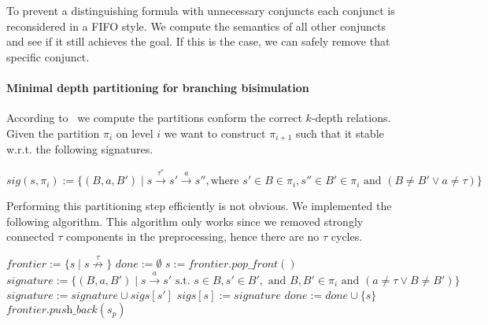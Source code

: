 \documentclass{article}
\newcommand{\pijl}[1]{\stackrel{#1}{\longrightarrow}}
\newcommand{\notpijl}[1]{\stackrel{#1}{\not\longrightarrow}}
\begin{document}
To prevent a distinguishing formula with unnecessary conjuncts each conjunct is
reconsidered in a FIFO style. We compute the semantics of all other conjuncts
and see if it still achieves the goal. If this is the case, we can safely remove
that specific conjunct.

\paragraph*{Minimal depth partitioning for branching bisimulation}
According to~\cite{M24} we compute the partitions conform the correct $k$-depth
relations. Given the partition $\pi_i$ on level $i$ we want to construct
$\pi_{i{+}1}$ such that it stable w.r.t. the following signatures.

\[
  \mathit{sig}(s, \pi_i) := \{(B, a, B') \mid s \pijl{\tau^*} s' \pijl{a} s''
  , \textrm{where } s'\in B\in \pi_i, s''\in B'\in \pi_i\textrm{ and } (B \neq B' \vee a \neq \tau) \}  
\]

Performing this partitioning step efficiently is not obvious. We implemented the
following algorithm. This algorithm only works since we removed strongly
connected $\tau$ components in the preprocessing, hence there are no $\tau$
cycles.

\begin{algorithmic}[1]
  \State $\textit{frontier} := \{s \mid s\notpijl{\tau}\}$\;
  \State $\textit{done} := \emptyset$\;
  \State $s := \textit{frontier.pop\_front}()$\;
  \State $\textit{signature} := \{(B, a, B') \mid s\pijl{a} s' \textrm{ s.t. } s\in B, s'\in B',\textrm{ and }  B, B'\in \pi_i \textrm{ and } (a \neq \tau \vee B \neq B')\}$\;
  \ForAll{$s\pijl{\tau} s'$}
    \State $\textit{signature} := \textit{signature} \cup sigs[s']$\;
  \EndFor 
  \State $\textit{sigs}[s] := signature$\;
  \State $\textit{done} := \textit{done} \cup \{s\}$\:
  \ForAll{$s_p \pijl{\tau} s$} 
    \If{$\{s' \mid s_p \pijl{\tau} s'\} \setminus \textit{done} = \emptyset$}
      \State $\textit{frontier.push\_back}(s_p)$\;
    \EndIf
  \EndFor
  

  \EndWhile
\end{algorithmic}  
\end{document}
